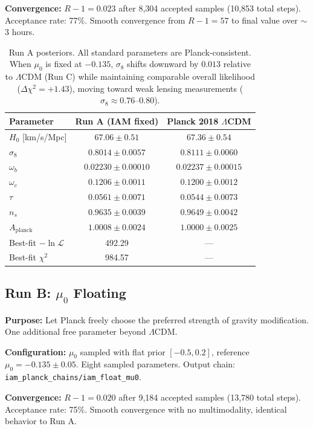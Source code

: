 \documentclass[11pt,letterpaper]{article}
\begin{document}
\textbf{Convergence:} $R-1 = 0.023$ after 8,304 accepted samples (10,853 total steps). Acceptance rate: 77\%. Smooth convergence from $R-1 = 57$ to final value over $\sim$3 hours.

\begin{table}[h]
\centering
\begin{tabular}{lcc}
\toprule
Parameter & Run A (IAM fixed) & Planck 2018 $\Lambda$CDM \\
\midrule
$H_0$ [km/s/Mpc] & $67.06 \pm 0.51$ & $67.36 \pm 0.54$ \\
$\sigma_8$ & $0.8014 \pm 0.0057$ & $0.8111 \pm 0.0060$ \\
$\omega_b$ & $0.02230 \pm 0.00010$ & $0.02237 \pm 0.00015$ \\
$\omega_c$ & $0.1206 \pm 0.0011$ & $0.1200 \pm 0.0012$ \\
$\tau$ & $0.0561 \pm 0.0071$ & $0.0544 \pm 0.0073$ \\
$n_s$ & $0.9635 \pm 0.0039$ & $0.9649 \pm 0.0042$ \\
$A_\mathrm{planck}$ & $1.0008 \pm 0.0024$ & $1.0000 \pm 0.0025$ \\
\midrule
Best-fit $-\ln\mathcal{L}$ & 492.29 & --- \\
Best-fit $\chi^2$ & 984.57 & --- \\
\bottomrule
\end{tabular}
\caption{Run A posteriors. All standard parameters are Planck-consistent. When $\mu_0$ is fixed at $-0.135$, $\sigma_8$ shifts downward by $0.013$ relative to $\Lambda$CDM (Run C) while maintaining comparable overall likelihood ($\Delta\chi^2 = +1.43$), moving toward weak lensing measurements ($\sigma_8 \approx 0.76$--$0.80$).}
\label{tab:runA}
\end{table}

\subsection{Run B: $\mu_0$ Floating}

\textbf{Purpose:} Let Planck freely choose the preferred strength of gravity modification. One additional free parameter beyond $\Lambda$CDM.

\textbf{Configuration:} $\mu_0$ sampled with flat prior $[-0.5, 0.2]$, reference $\mu_0 = -0.135 \pm 0.05$. Eight sampled parameters. Output chain: \texttt{iam\_planck\_chains/iam\_float\_mu0}.

\textbf{Convergence:} $R-1 = 0.020$ after 9,184 accepted samples (13,780 total steps). Acceptance rate: 75\%. Smooth convergence with no multimodality, identical behavior to Run A.
\end{document}
